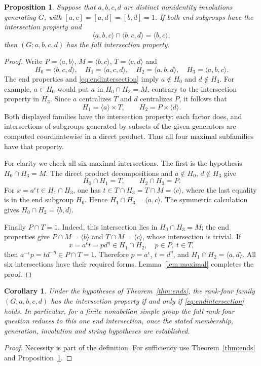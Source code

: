 \documentclass[11pt]{article}
\newtheorem{proposition}[theorem]{Proposition}
\newtheorem{corollary}[theorem]{Corollary}
\theoremstyle{definition}\newtheorem{definition}[theorem]{Definition}
\newcommand{\gen}[1]{\langle #1\rangle}
\begin{document}
\begin{proposition}\label{prop:gluing}
Suppose that $a,b,c,d$ are distinct nonidentity involutions generating
$G$, with $[a,c]=[a,d]=[b,d]=1$.  If both end subgroups have the
intersection property and
\begin{equation}\label{eq:endintersection}
                \gen{a,b,c}\cap\gen{b,c,d}=\gen{b,c},
\end{equation}
then $(G;a,b,c,d)$ has the full intersection property.
\end{proposition}
\begin{proof}
Write $P=\gen{a,b}$, $M=\gen{b,c}$, $T=\gen{c,d}$ and
\[
 H_0=\gen{b,c,d},\quad H_1=\gen{a,c,d},\quad
 H_2=\gen{a,b,d},\quad H_3=\gen{a,b,c}.
\]
The end properties and \eqref{eq:endintersection} imply $a\notin H_0$
and $d\notin H_3$.  For example, $a\in H_0$ would put $a$ in
$H_0\cap H_3=M$, contrary to the intersection property in $H_3$.
Since $a$ centralizes $T$ and $d$ centralizes $P$, it follows that
\[
                  H_1=\gen a\times T,\qquad
                  H_2=P\times\gen d.
\]
Both displayed families have the intersection property: each factor
does, and intersections of subgroups generated by subsets of the given
generators are computed coordinatewise in a direct product.
Thus all four maximal subfamilies have that property.

For clarity we check all six maximal intersections.  The first is the
hypothesis $H_0\cap H_3=M$.  The direct product decompositions and
$a\notin H_0$, $d\notin H_3$ give
\[
                  H_0\cap H_1=T,\qquad H_2\cap H_3=P.
\]
For $x=a^\epsilon t\in H_1\cap H_3$, one has
$t\in T\cap H_3=T\cap M=\gen c$, where the last equality is in
the end subgroup $H_0$.  Hence $H_1\cap H_3=\gen{a,c}$.
The symmetric calculation gives $H_0\cap H_2=\gen{b,d}$.

Finally $P\cap T=1$.  Indeed, this intersection lies in $H_0\cap H_3=M$;
the end properties give $P\cap M=\gen b$ and $T\cap M=\gen c$,
whose intersection is trivial.  If
\[
                 x=a^\epsilon t=p d^\eta\in H_1\cap H_2,
                 \quad p\in P,\ t\in T,
\]
then $a^{-\epsilon}p=t d^{-\eta}\in P\cap T=1$.
Therefore $p=a^\epsilon$, $t=d^\eta$, and
$H_1\cap H_2=\gen{a,d}$.  All six intersections have their required
forms.  Lemma~\ref{lem:maximal} completes the proof.
\end{proof}

\begin{corollary}\label{cor:onecondition}
Under the hypotheses of Theorem~\ref{thm:ends}, the rank-four family
$(G;a,b,c,d)$ has the intersection property if and only if
\eqref{eq:endintersection} holds.  In particular, for a finite nonabelian
simple group the full rank-four question reduces to this one end
intersection, once the stated membership, generation, involution and
string hypotheses are established.
\end{corollary}
\begin{proof}
Necessity is part of the definition.  For sufficiency use
Theorem~\ref{thm:ends} and Proposition~\ref{prop:gluing}.
\end{proof}
\end{document}
